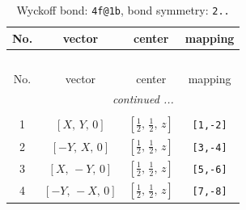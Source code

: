 \documentclass[fleqn,8pt]{jsarticle}
\begin{document}
\renewcommand{\arraystretch}{1.2}
\begin{longtable}{cccc}
\caption{Wyckoff bond: {\tt 4f@1b}, bond symmetry: {\tt 2..}}
 \\
 \hline \hline
No. & vector & center & mapping \\ \hline \endfirsthead

\multicolumn{3}{l}{\tablename\ \thetable{}} \\
 \hline \hline
No. & vector & center & mapping \\ \hline \endhead

 \hline \hline
\multicolumn{3}{r}{\footnotesize\it continued ...} \\ \endfoot

 \hline \hline
\multicolumn{3}{r}{} \\ \endlastfoot

1 & $\left[ X,\, Y,\, 0 \right]$ & $\left[ \frac{1}{2},\, \frac{1}{2},\, z \right]$ & {\tt [1,-2]} \\ \hline
2 & $\left[ - Y,\, X,\, 0 \right]$ & $\left[ \frac{1}{2},\, \frac{1}{2},\, z \right]$ & {\tt [3,-4]} \\ \hline
3 & $\left[ X,\, - Y,\, 0 \right]$ & $\left[ \frac{1}{2},\, \frac{1}{2},\, z \right]$ & {\tt [5,-6]} \\ \hline
4 & $\left[ - Y,\, - X,\, 0 \right]$ & $\left[ \frac{1}{2},\, \frac{1}{2},\, z \right]$ & {\tt [7,-8]} \\
\end{longtable}
\renewcommand{\arraystretch}{1.2}
\end{document}
